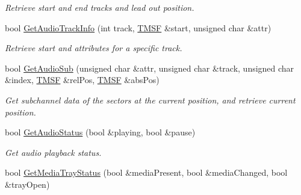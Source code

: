 \begin{DoxyCompactItemize}
\begin{DoxyCompactList}\small\item\em Retrieve start and end tracks and lead out position. \end{DoxyCompactList}\item 
\hypertarget{classCDROM__Interface__Image_a1a1c42c11d483e82f41c6012f5f7d602}{bool \hyperlink{classCDROM__Interface__Image_a1a1c42c11d483e82f41c6012f5f7d602}{Get\-Audio\-Track\-Info} (int track, \hyperlink{structSMSF}{T\-M\-S\-F} \&start, unsigned char \&attr)}\label{classCDROM__Interface__Image_a1a1c42c11d483e82f41c6012f5f7d602}

\begin{DoxyCompactList}\small\item\em Retrieve start and attributes for a specific track. \end{DoxyCompactList}\item 
\hypertarget{classCDROM__Interface__Image_a11ba4965b5dd42015aff3d9f4b607abc}{bool \hyperlink{classCDROM__Interface__Image_a11ba4965b5dd42015aff3d9f4b607abc}{Get\-Audio\-Sub} (unsigned char \&attr, unsigned char \&track, unsigned char \&index, \hyperlink{structSMSF}{T\-M\-S\-F} \&rel\-Pos, \hyperlink{structSMSF}{T\-M\-S\-F} \&abs\-Pos)}\label{classCDROM__Interface__Image_a11ba4965b5dd42015aff3d9f4b607abc}

\begin{DoxyCompactList}\small\item\em Get subchannel data of the sectors at the current position, and retrieve current position. \end{DoxyCompactList}\item 
\hypertarget{classCDROM__Interface__Image_a5151e50027294571fafb414d751ca332}{bool \hyperlink{classCDROM__Interface__Image_a5151e50027294571fafb414d751ca332}{Get\-Audio\-Status} (bool \&playing, bool \&pause)}\label{classCDROM__Interface__Image_a5151e50027294571fafb414d751ca332}

\begin{DoxyCompactList}\small\item\em Get audio playback status. \end{DoxyCompactList}\item 
\hypertarget{classCDROM__Interface__Image_a8c5afdabeea94743f487fae4623eacac}{bool \hyperlink{classCDROM__Interface__Image_a8c5afdabeea94743f487fae4623eacac}{Get\-Media\-Tray\-Status} (bool \&media\-Present, bool \&media\-Changed, bool \&tray\-Open)}\label{classCDROM__Interface__Image_a8c5afdabeea94743f487fae4623eacac}


\end{DoxyCompactItemize}
